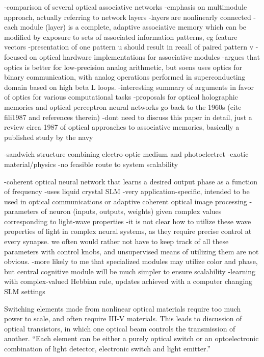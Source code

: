 \cite{fili1987}
-comparison of several optical associative networks
-emphasis on multimodule approach, actually referring to network layers
-layers are nonlinearly connected
-each module (layer) is a complete, adaptive associative memory which can be modified by exposure to sets of associated information patterns, eg feature vectors
-presentation of one pattern u should result in recall of paired pattern v
-focused on optical hardware implementations for associative modules
-argues that optics is better for low-precision analog arithmetic, but soens uses optics for binary communication, with analog operations performed in superconducting domain based on high beta L loops.
-interesting summary of arguments in favor of optics for various computational tasks
-proposals for optical holographic memories and optical perceptron neural networks go back to the 1960s (cite fili1987 and references therein)
-dont need to discuss this paper in detail, just a review circa 1987 of optical approaches to associative memories, basically a published study by the navy

\cite{mo2000}
-sandwich structure combining electro-optic medium and photoelectret
-exotic material/physics
-no feasible route to system scalability


\cite{kahi2003}
-coherent optical neural network that learns a desired output phase as a function of frequency
-uses liquid crystal SLM
-very application-specific, intended to be used in optical communications or adaptive coherent optical image processing
-parameters of neuron (inputs, outputs, weights) given complex values corresponding to light-wave properties
-it is not clear how to utilize these wave properties of light in complex neural systems, as they require precise control at every synapse. we often would rather not have to keep track of all these parameters with control knobs, and unsupervised means of utilizing them are not obvious.
-more likely to me that specialized modules may utilize color and phase, but central cognitive module will be much simpler to ensure scalability
-learning with complex-valued Hebbian rule, updates achieved with a computer changing SLM settings

\vspace{3em}
Switching elements made from nonlinear optical materials require too much power to scale, and often require III-V materials. This leads to discussion of optical transistors, in which one optical beam controls the transmission of another. ``Each element can be either a purely optical switch or an optoelectronic combination of light detector, electronic switch and light emitter.'' \cite{abps1987}

